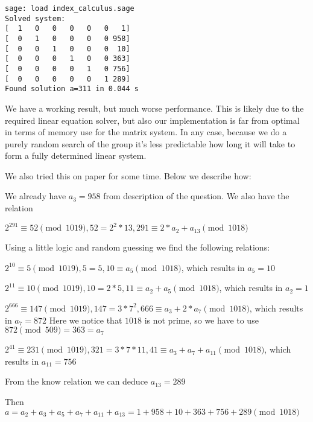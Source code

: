 \documentclass{article}
\begin{document}
\begin{verbatim}
sage: load index_calculus.sage
Solved system:
[  1   0   0   0   0   0   1]
[  0   1   0   0   0   0 958]
[  0   0   1   0   0   0  10]
[  0   0   0   1   0   0 363]
[  0   0   0   0   1   0 756]
[  0   0   0   0   0   1 289]
Found solution a=311 in 0.044 s
\end{verbatim}

We have a working result, but much worse performance.
This is likely due to the required linear equation solver, but also our implementation is far from optimal in terms of memory use for the matrix system.
In any case, because we do a purely random search of the group it's less predictable how long it will take to form a fully determined linear system.

We also tried this on paper for some time. Below we describe how:

We already have $a_3 = 958$ from description of the question. We also have the relation 

$2^{291} \equiv 52 \pmod{1019}, 52 = 2^2 * 13, 291 \equiv 2*a_2 + a_{13} \pmod{1018} $

Using a little logic and random guessing we find the following relations:

$2^{10} \equiv 5 \pmod{1019}, 5 = 5, 10 \equiv a_{5} \pmod{1018} $, which results in $a_5 = 10$

$2^{11} \equiv 10 \pmod{1019}, 10 = 2*5, 11 \equiv a_2 + a_{5} \pmod{1018} $, which results in $a_2 = 1$

$2^{666} \equiv 147 \pmod{1019}, 147 = 3*7^2, 666 \equiv a_3 + 2*a_{7} \pmod{1018} $, which results in $a_7 = 872$
Here we notice that $1018$ is not prime, so we have to use $872 \pmod{509} = 363 = a_7$

$2^{41} \equiv 231 \pmod{1019}, 321 = 3*7*11, 41 \equiv a_3 + a_7 + a_11 \pmod{1018} $, which results in $a_11 = 756$

From the know relation we can deduce $a_{13} = 289$

Then $a = a_2+a_3+a_5+a_7+a_{11}+a_{13} = 1 + 958 + 10 + 363 + 756 + 289 \pmod{1018}$
\end{document}
